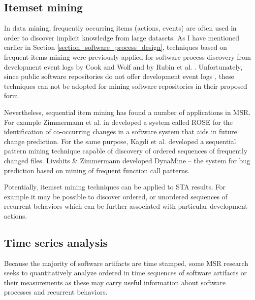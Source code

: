 \subsection{Itemset mining}
In data mining, frequently occurring items (actions, events) are often used in order to discover implicit knowledge from
large datasets. As I have mentioned earlier in Section \ref{section_software_process_design}, techniques based on frequent
items mining were previously applied for software process discovery from development event logs 
by Cook and Wolf \cite{citeulike:328044} \cite{citeulike:5120757} \cite{citeulike:5128143} 
and by Rubin et al. \cite{citeulike:1885717}. Unfortunately, since public software repositories do not offer 
development event logs \cite{citeulike:1296888}, these techniques can not be adopted for mining software 
repositories in their proposed form.

Nevertheless, sequential item mining has found a number of applications in MSR.
For example Zimmermann et al. in \cite{citeulike:277045} developed a system called ROSE for the identification of 
co-occurring changes in a software system that aids in future change prediction. 
For the same purpose, Kagdi et al. \cite{citeulike:3929070} developed a sequential pattern mining technique capable of 
discovery of ordered sequences of frequently changed files. 
Livshits \& Zimmermann \cite{citeulike:393158} developed DynaMine -- the system for bug prediction based on mining 
of frequent function call patterns.

Potentially, itemset mining  techniques can be applied to STA results. For example it may be possible to discover ordered, or
unordered sequences of recurrent behaviors which can be further associated with particular development actions.

\subsection{Time series analysis}\label{chapter2_section-tsanalysis}
Because the majority of software artifacts are time stamped, some MSR research seeks to quantitatively analyze ordered 
in time sequences of software artifacts or their measurements as these may carry useful information about software 
processes and recurrent behaviors. 

